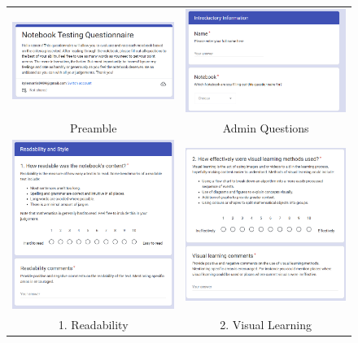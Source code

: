 \begin{appendices}
\begin{figure}[H]
\centering
\begin{tabular}{cc}
\includegraphics[width=65mm]{images/questionnaire/preamble} & \includegraphics[width=65mm]{images/questionnaire/q0} \\
Preamble & Admin Questions \\[6pt]
\includegraphics[width=65mm]{images/questionnaire/q1} &   \includegraphics[width=65mm]{images/questionnaire/q2} \\
1. Readability & 2. Visual Learning \\[6pt]

\end{tabular}
\end{figure}
\end{appendices}
